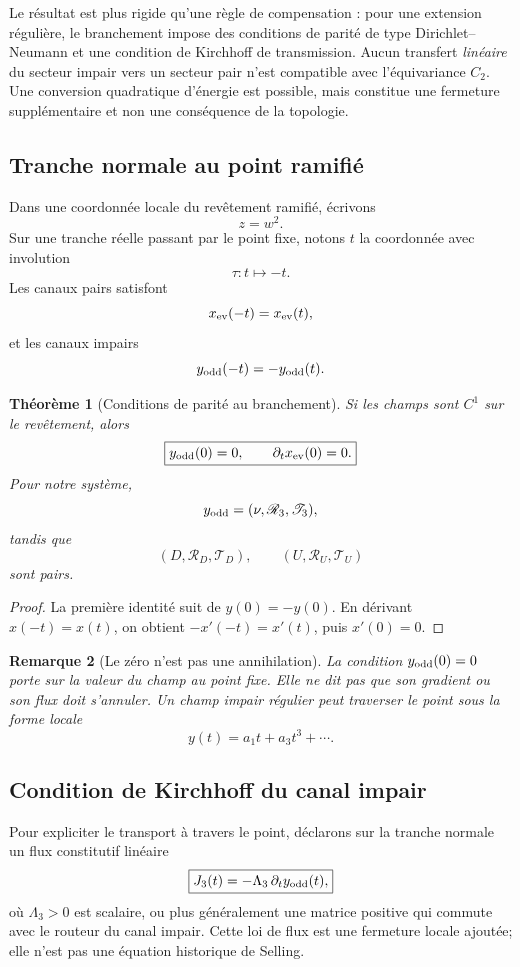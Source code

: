 \documentclass[11pt,a4paper]{article}
\newtheorem{theorem}{Théorème}[section]
\newtheorem{remark}[theorem]{Remarque}
\begin{document}
Le résultat est plus rigide qu'une règle de compensation : pour une extension régulière, le branchement impose des conditions de parité de type Dirichlet--Neumann et une condition de Kirchhoff de transmission. Aucun transfert \emph{linéaire} du secteur impair vers un secteur pair n'est compatible avec l'équivariance $C_2$. Une conversion quadratique d'énergie est possible, mais constitue une fermeture supplémentaire et non une conséquence de la topologie.

\subsection{Tranche normale au point ramifié}

Dans une coordonnée locale du revêtement ramifié, écrivons
\[
 z=w^2.
\]
Sur une tranche réelle passant par le point fixe, notons $t$ la coordonnée avec involution
\[
 \tau:t\longmapsto -t.
\]
Les canaux pairs satisfont
\[
 x_{\rm ev}(-t)=x_{\rm ev}(t),
\]
et les canaux impairs
\[
 y_{\rm odd}(-t)=-y_{\rm odd}(t).
\]

\begin{theorem}[Conditions de parité au branchement]\label{thm:v19-parity-bc}
Si les champs sont $C^1$ sur le revêtement, alors
\[
 \boxed{
 y_{\rm odd}(0)=0,
 \qquad
 \partial_t x_{\rm ev}(0)=0.}
\]
Pour notre système,
\[
 y_{\rm odd}
 =
 (\nu,\mathscr R_3,\mathscr T_3),
\]
tandis que
\[
 (D,\mathscr R_D,\mathscr T_D),
 \qquad
 (U,\mathscr R_U,\mathscr T_U)
\]
sont pairs.
\end{theorem}

\begin{proof}
La première identité suit de $y(0)=-y(0)$. En dérivant $x(-t)=x(t)$, on obtient $-x'(-t)=x'(t)$, puis $x'(0)=0$.
\end{proof}

\begin{remark}[Le zéro n'est pas une annihilation]
La condition $y_{\rm odd}(0)=0$ porte sur la valeur du champ au point fixe. Elle ne dit pas que son gradient ou son flux doit s'annuler. Un champ impair régulier peut traverser le point sous la forme locale
\[
 y(t)=a_1t+a_3t^3+\cdots.
\]
\end{remark}

\subsection{Condition de Kirchhoff du canal impair}

Pour expliciter le transport à travers le point, déclarons sur la tranche normale un flux constitutif linéaire
\[
 \boxed{
 J_3(t)
 =
 -\Lambda_3\,\partial_t y_{\rm odd}(t),}
\]
où $\Lambda_3>0$ est scalaire, ou plus généralement une matrice positive qui commute avec le routeur du canal impair. Cette loi de flux est une fermeture locale ajoutée; elle n'est pas une équation historique de Selling.
\end{document}
